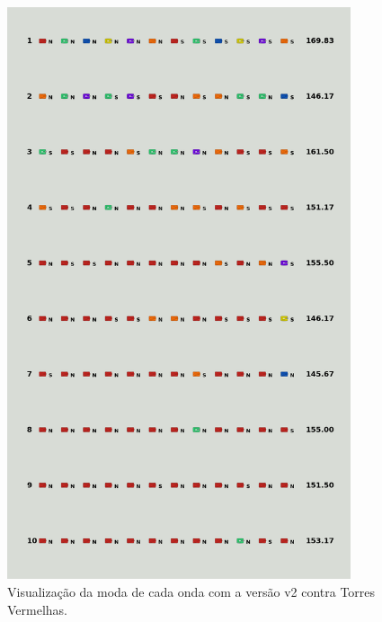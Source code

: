 \begin{figure}[H]
  \centering
  \includegraphics[width=0.9\textwidth]{figuras/td/td_allred_ai_mode_2_1.png}
  \caption{Visualização da moda de cada onda com a versão v2 contra Torres Vermelhas.}
  \label{fig:td-moda-red-2-1}
\end{figure}


